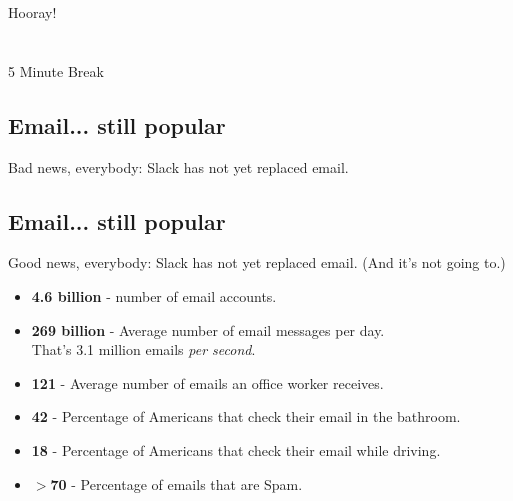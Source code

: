 \documentclass[xga]{xdvislides}
\begin{document}
\newpage
\vspace*{\fill}
\begin{center}
    \Hugesize
        Hooray! \\ [1em]
    \hspace*{5mm}
    \blueline\\
    \hspace*{5mm}\\
        5 Minute Break
\end{center}
\vspace*{\fill}

\subsection{Email... still popular}
Bad news, everybody: Slack has not yet replaced email.

\subsection{Email... still popular}
Good news, everybody: Slack has not yet replaced email. (And it's not going to.)
\\

\begin{itemize}
	\item {\bf 4.6 billion} - number of email accounts.
	\item {\bf 269 billion} - Average number of email messages per day. \\
		That's 3.1 million emails {\em per second}.
	\item {\bf 121} - Average number of emails an office worker receives.
	\item {\bf 42} - Percentage of Americans that check their email in the bathroom.
	\item {\bf 18} - Percentage of Americans that check their email while driving.
	\item {\bf $>$70} - Percentage of emails that are Spam.
\end{itemize}
\end{document}
